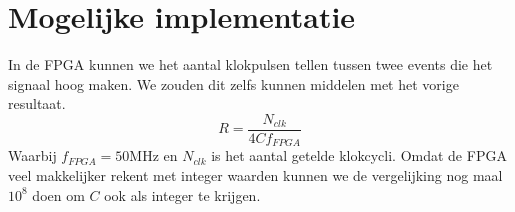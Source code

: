 \documentclass{report}
\begin{document}
\section{Mogelijke implementatie}
In de FPGA kunnen we het aantal klokpulsen tellen tussen twee events die het signaal hoog maken. We zouden dit zelfs kunnen middelen met het vorige resultaat.
\begin{equation}
\label{eq:fpgaEq}
R = \frac{N_{clk}}{4Cf_{FPGA}}
\end{equation}
Waarbij $f_{FPGA} = 50 \mathrm{MHz}$ en $N_{clk}$ is het aantal getelde klokcycli. Omdat de FPGA veel makkelijker rekent met integer waarden kunnen we de vergelijking nog maal $10^8$ doen om $C$ ook als integer te krijgen.
\end{document}
